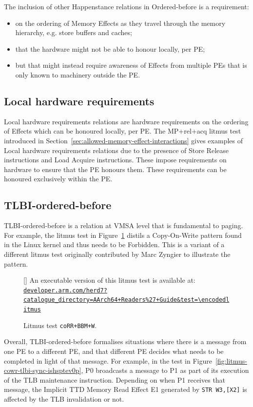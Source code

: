 \documentclass{book}
\newcommand{\litmusinput}[1]{%
}
\newcommand{\herdweburl}{https://developer.arm.com/herd7}
\newcommand{\herdweburldisplay}{developer.arm.com/herd7}
\newcommand{\litmusinputwithlinkat}[3][]{%
  \par
  \begin{figure}[#2]
    \litmusinput{#3}%
    \par\smallskip
    {\footnotesize
    \begingroup
    \StrSubstitute{#3}{+}{\%2B}[\encodedlitmus]%
    \edef\targeturl{\herdweburl?catalogue_directory=AArch64+Readers\%27+Guide\&test=\encodedlitmus}%
    \edef\displayurl{\herdweburldisplay?catalogue_directory=AArch64+Readers\%27+Guide&test=\encodedlitmus}%
    An executable version of this litmus test is available at:
    \href{\targeturl}{\nolinkurl{\displayurl}}%
    \endgroup
    \par}
    \caption{Litmus test \texttt{#3}.}
    \if\relax\detokenize{#1}\relax\else\label{#1}\fi
  \end{figure}
}
\newcommand{\floatinglitmusinputwithlink}[2][]{%
  \litmusinputwithlinkat[#1]{!htbp}{#2}%
}
\begin{document}
The inclusion of other Happenstance relations in
Ordered-before is a requirement: 
\begin{itemize}
\item on the ordering of Memory Effects as they travel through the memory hierarchy, e.g. store buffers and caches; 
\item that the hardware might not be able to honour locally, per PE; 
\item but that might instead require awareness of Effects from multiple PEs that is only known to machinery outside the PE. 
\end{itemize}

\subsection{Local hardware requirements}

Local hardware requirements relations are hardware requirements on the ordering
of Effects which can be honoured locally, per PE.
%
The MP+rel+acq litmus test introduced in
Section~\ref{sec:allowed-memory-effect-interactions} gives examples of Local
hardware requirements relations due to the presence of Store Release
instructions and Load Acquire instructions.
%
These impose requirements on hardware to ensure that the PE honours them. These
requirements can be honoured exclusively within the PE.

\subsection{\label{sec:TLBI-ordered-before} TLBI-ordered-before}

TLBI-ordered-before is a relation at VMSA level that is fundamental to paging.
For example, the litmus test in Figure~\ref{fig:litmus-corr-bbm-w} distils a
Copy-On-Write pattern found in the Linux kernel and thus needs to be Forbidden.
This is a variant of a different litmus test originally contributed by Marc
Zyngier to illustrate the pattern.

\floatinglitmusinputwithlink[fig:litmus-corr-bbm-w]{coRR+BBM+W}

Overall, TLBI-ordered-before formalises situations where there is a message
from one PE to a different PE, and that different PE decides what needs to be
completed in light of that message.
%
For example, in the test in
Figure~\ref{fig:litmus-cowr-tlbi-sync-ishsptev0p}, P0 broadcasts a message to
P1 as part of its execution of the TLB maintenance instruction. Depending on
when P1 receives that message, the Implicit TTD Memory Read Effect E1 generated
by \texttt{STR W3,[X2]} is affected by the TLB invalidation or not.
\end{document}
